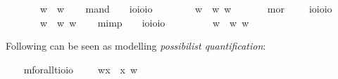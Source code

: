 \begin{isabellebody}
\ \ \ \ \ {\isachardoublequoteopen}\isactrlbold {\isasymnot}{\isasymphi}\ {\isasymequiv}\ {\isasymlambda}w{\isachardot}\ {\isasymnot}{\isacharparenleft}{\isasymphi}\ w{\isacharparenright}{\isachardoublequoteclose}\isanewline
\ \ \isamarkupfalse%
\ mand\ \ \ {\isacharcolon}{\isacharcolon}\ {\isachardoublequoteopen}io{\isasymRightarrow}io{\isasymRightarrow}io{\isachardoublequoteclose}\ {\isacharparenleft}\isanewline
\ \ \ \ \ {\isachardoublequoteopen}{\isasymphi}\isactrlbold {\isasymand}{\isasympsi}\ {\isasymequiv}\ {\isasymlambda}w{\isachardot}\ {\isacharparenleft}{\isasymphi}\ w{\isacharparenright}{\isasymand}{\isacharparenleft}{\isasympsi}\ w{\isacharparenright}{\isachardoublequoteclose}\ \ \ \isanewline
\ \ \isamarkupfalse%
\ mor\ \ \ \ {\isacharcolon}{\isacharcolon}\ {\isachardoublequoteopen}io{\isasymRightarrow}io{\isasymRightarrow}io{\isachardoublequoteclose}\ {\isacharparenleft}\isanewline
\ \ \ \ \ {\isachardoublequoteopen}{\isasymphi}\isactrlbold {\isasymor}{\isasympsi}\ {\isasymequiv}\ {\isasymlambda}w{\isachardot}\ {\isacharparenleft}{\isasymphi}\ w{\isacharparenright}{\isasymor}{\isacharparenleft}{\isasympsi}\ w{\isacharparenright}{\isachardoublequoteclose}\isanewline
\ \ \isamarkupfalse%
\ mimp\ \ \ {\isacharcolon}{\isacharcolon}\ {\isachardoublequoteopen}io{\isasymRightarrow}io{\isasymRightarrow}io{\isachardoublequoteclose}\ {\isacharparenleft}\ \isanewline
\ \ \ \ \ {\isachardoublequoteopen}{\isasymphi}\isactrlbold {\isasymrightarrow}{\isasympsi}\ {\isasymequiv}\ {\isasymlambda}w{\isachardot}\ {\isacharparenleft}{\isasymphi}\ w{\isacharparenright}{\isasymlongrightarrow}{\isacharparenleft}{\isasympsi}\ w{\isacharparenright}{\isachardoublequoteclose}%
\begin{isamarkuptext}%
Following can be seen as modelling \emph{possibilist quantification}:%
\end{isamarkuptext}\isamarkuptrue%
\ \ \isamarkupfalse%
\ mforall{\isacharcolon}{\isacharcolon}{\isachardoublequoteopen}{\isacharparenleft}{\isacharprime}t{\isasymRightarrow}io{\isacharparenright}{\isasymRightarrow}io{\isachardoublequoteclose}\ {\isacharparenleft}{\isachardoublequoteopen}\isactrlbold {\isasymforall}{\isachardoublequoteclose}{\isacharparenright}\ \ {\isachardoublequoteopen}\isactrlbold {\isasymforall}{\isasymPhi}\ {\isasymequiv}\ {\isasymlambda}w{\isachardot}{\isasymforall}x{\isachardot}\ {\isacharparenleft}{\isasymPhi}\ x\ w{\isacharparenright}{\isachardoublequoteclose}\isanewline

\end{isabellebody}
